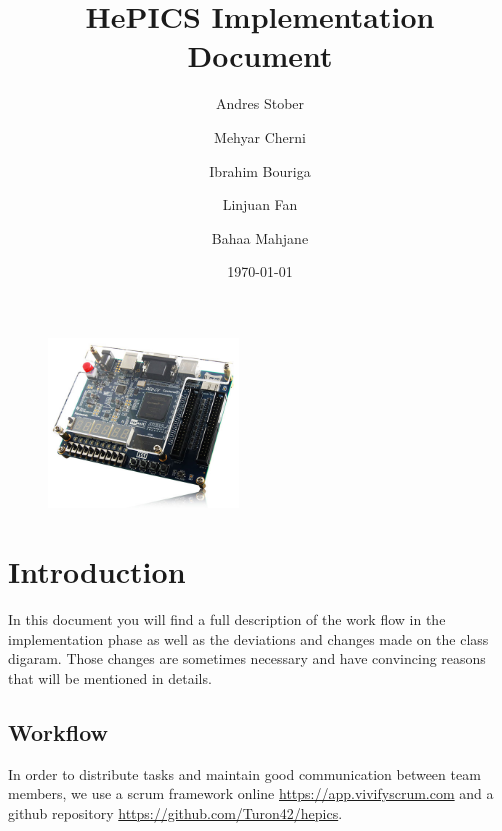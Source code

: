 \documentclass[parskip=full]{scrartcl}
\title{\Huge \textbf{HePICS Implementation Document}}
\date{\today \vspace{+10ex}}
\author{Andres Stober \\
	\and Mehyar Cherni \\
	\and Ibrahim Bouriga \\ 
	\and Linjuan Fan \\
	\and Bahaa Mahjane \\ }
\newcommand\tab[1][1cm]{\hspace*{#1}}
\begin{document}
\maketitle
\thispagestyle{empty}


\begin{figure}[b]
\centering
\includegraphics[width=0.45\textwidth, center]{boardimage}
\end{figure}

\pagebreak

\tableofcontents
\thispagestyle{empty}
\pagebreak



\section {Introduction}
	\tab In this document you will find a full description of the work flow in the implementation phase as well as the deviations and changes made on the class digaram. Those changes are sometimes necessary and have convincing reasons that will be mentioned in details.
	\subsection{Workflow}
	\tab In order to distribute tasks and maintain good communication between team members, we use a scrum framework online 	\url{https://app.vivifyscrum.com} and a github repository \url{https://github.com/Turon42/hepics}.
	
\end{document}
